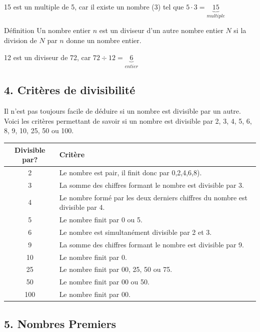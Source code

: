 \begin{center}15 est un multiple de 5, car il existe un nombre (3) tel que $5\cdot 3=\underset{multiple}{\underbrace{15}}$\end{center}

\begin{regle}{Définition}
Un nombre entier $n$ est un \textcolor{themeNO}{diviseur} d'un autre nombre entier $N$ si la division de $N$ par $n$ donne un nombre entier. 
\end{regle}

\begin{center}12 est un diviseur de 72, car $72\div12=\underset{entier}{\underbrace{6}}$\end{center}

\vfill
\subsection*{4. Critères de divisibilité }

Il n'est pas toujours facile de déduire si un nombre est divisible par un autre. Voici les critères permettant de savoir si un nombre est divisible par 2, 3, 4, 5, 6, 8, 9, 10, 25, 50 ou 100.

\vspace{10pt}
\def\arraystretch{1.1}
\begin{tabularx}{\linewidth}{|c|X|}
\hline
Divisible par?&Critère\\\hline
2&Le nombre est pair, il finit donc par 0,2,4,6,8).\\\hline
3&La somme des chiffres formant le nombre est divisible par 3.\\\hline
4&Le nombre formé par les deux derniers chiffres du nombre est divisible par 4.\\\hline
5&Le nombre finit par 0 ou 5.\\\hline
6&Le nombre est simultanément divisible par 2 et 3.\\\hline
9&La somme des chiffres formant le nombre est divisible par 9.\\\hline
10&Le nombre finit par 0.\\\hline
25&Le nombre finit par 00, 25, 50 ou 75.\\\hline
50&Le nombre finit par 00 ou 50.\\\hline
100&Le nombre finit par 00.\\\hline
\end{tabularx}
\def\arraystretch{1}

\newpage
\subsection*{5. Nombres Premiers}

